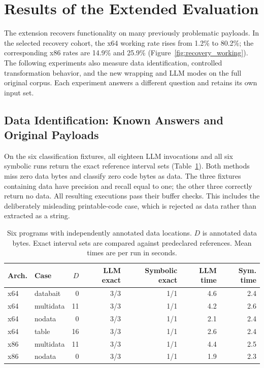 \section{Results of the Extended Evaluation}\label{sec:extended_results}
The extension recovers functionality on many previously problematic
payloads. In the selected recovery cohort, the x64 working rate rises
from 1.2\% to 80.2\%; the corresponding x86 rates are 14.9\% and 25.9\%
(Figure~\ref{fig:recovery_working}). The following experiments also measure
data identification, controlled transformation behavior, and the new wrapping
and LLM modes on the full original corpus. Each experiment answers a
different question and retains its own input set.

\subsection{Data Identification: Known Answers and Original Payloads}
On the six classification fixtures, all eighteen LLM invocations and all
six symbolic runs return the exact reference interval sets
(Table~\ref{tab:new_classifier}). Both methods miss zero data bytes and
classify zero code bytes as data. The three fixtures containing data have
precision and recall equal to one; the other three correctly return no
data. All resulting executions pass their buffer checks. This includes
the deliberately misleading printable-code case, which is rejected as
data rather than extracted as a string.


\begin{table}[t]
\caption{Six programs with independently annotated data locations. $D$ is annotated data bytes.
Exact interval sets are compared against predeclared references.
Mean times are per run in seconds.}
\label{tab:new_classifier}
\centering\small\setlength{\tabcolsep}{4pt}
\begin{tabular}{@{}llrrrrr@{}}
\toprule
Arch. & Case & $D$ & LLM exact & Symbolic exact & LLM time & Sym. time \\
\midrule
x64 & databait & 0 & 3/3 & 1/1 & 4.6 & 2.4 \\
x64 & multidata & 11 & 3/3 & 1/1 & 4.2 & 2.6 \\
x64 & nodata & 0 & 3/3 & 1/1 & 2.1 & 2.4 \\
x64 & table & 16 & 3/3 & 1/1 & 2.6 & 2.4 \\
x86 & multidata & 11 & 3/3 & 1/1 & 4.4 & 2.5 \\
x86 & nodata & 0 & 3/3 & 1/1 & 1.9 & 2.3 \\
\bottomrule
\end{tabular}
\end{table}


